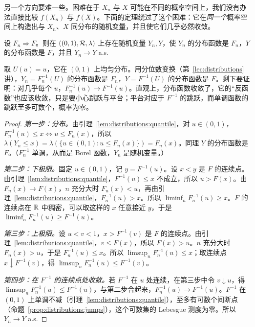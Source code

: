 另一个方向要难一些。困难在于 $X_n$ 与 $X$ 可能在不同的概率空间上，我们没有办法直接比较 $f(X_n)$ 与 $f(X)$。下面的定理绕过了这个困难：它在\emph{同一个}概率空间上构造出与 $X_n$、$X$ 同分布的随机变量，并且使它们几乎必然收敛。

\begin{theorem}\label{thm:convergence:skorokhod}
设 $F_n\Rightarrow F$。则在 $((0,1),\mathcal{R},\lambda)$ 上存在随机变量 $Y_n,Y$，使 $Y_n$ 的分布函数是 $F_n$，$Y$ 的分布函数是 $F$，并且 $Y_n\to Y$ a.s.
\end{theorem}

\begin{remark}[证明思路]
取 $U(u)=u$，它在 $(0,1)$ 上均匀分布。用分位数变换（第~\ref{lec:distributions} 讲），$Y_n=F_n^{-1}(U)$ 的分布函数是 $F_n$，$Y=F^{-1}(U)$ 的分布函数是 $F$。剩下要证明：对几乎每个 $u$，$F_n^{-1}(u)\to F^{-1}(u)$。直观上，分布函数收敛了，它的“反函数”也应该收敛，只是要小心跳跃与平台；平台对应于 $F^{-1}$ 的跳跃，而单调函数的跳跃至多可数个，概率为零。
\end{remark}

\begin{proof}
\emph{第一步：分布。}由引理~\ref{lem:distributions:quantile}，对 $u\in(0,1)$，$F_n^{-1}(u)\leqslant x\iff u\leqslant F_n(x)$，所以 $\lambda(Y_n\leqslant x)=\lambda(\{u\in(0,1):u\leqslant F_n(x)\})=F_n(x)$。同理 $Y$ 的分布函数是 $F$。（$F_n^{-1}$ 单调，从而是 Borel 函数，$Y_n$ 是随机变量。）

\emph{第二步：下极限。}固定 $u\in(0,1)$，记 $y=F^{-1}(u)$。设 $x<y$ 是 $F$ 的连续点。由引理~\ref{lem:distributions:quantile}，$F^{-1}(u)\leqslant x$ 不成立，所以 $u>F(x)$。由 $F_n(x)\to F(x)$，$n$ 充分大时 $F_n(x)<u$，再由引理~\ref{lem:distributions:quantile}，$F_n^{-1}(u)>x$。所以 $\liminf_nF_n^{-1}(u)\geqslant x$。$F$ 的连续点在 $\mathbb{R}$ 中稠密，可以取这样的 $x$ 任意接近 $y$，于是 $\liminf_nF_n^{-1}(u)\geqslant F^{-1}(u)$。

\emph{第三步：上极限。}设 $u<v<1$，$x>F^{-1}(v)$ 是 $F$ 的连续点。由引理~\ref{lem:distributions:quantile}，$v\leqslant F(x)$，所以 $F(x)>u$。$n$ 充分大时 $F_n(x)>u$，于是 $F_n^{-1}(u)\leqslant x$。所以 $\limsup_nF_n^{-1}(u)\leqslant x$；取连续点 $x\downarrow F^{-1}(v)$，得 $\limsup_nF_n^{-1}(u)\leqslant F^{-1}(v)$。

\emph{第四步：在 $F^{-1}$ 的连续点处收敛。}若 $F^{-1}$ 在 $u$ 处连续，在第三步中令 $v\downarrow u$，得 $\limsup_nF_n^{-1}(u)\leqslant F^{-1}(u)$，与第二步合起来，$F_n^{-1}(u)\to F^{-1}(u)$。$F^{-1}$ 在 $(0,1)$ 上单调不减（引理~\ref{lem:distributions:quantile}），至多有可数个间断点（命题~\ref{prop:distributions:jumps}），这个可数集的 Lebesgue 测度为零。所以 $Y_n\to Y$ a.s.
\end{proof}


